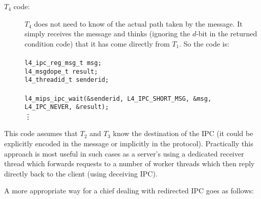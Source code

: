 \begin{description}
\item[$T_4$ code:]
  $T_4$ does not need to know of the actual path taken by the message.
  It simply receives the message and thinks (ignoring the
  \(d\)-bit in the returned condition code) that it has come directly
  from $T_1$. So the code is: \\ \\
  \hspace*{10pt} {\footnotesize\verb+l4_ipc_reg_msg_t msg;+} \\
  \hspace*{10pt} {\footnotesize\verb+l4_msgdope_t result;+} \\
  \hspace*{10pt} {\footnotesize\verb+l4_threadid_t senderid;+} \\ \\
  \hspace*{10pt} {\footnotesize\verb+l4_mips_ipc_wait(&senderid, L4_IPC_SHORT_MSG, &msg, L4_IPC_NEVER, &result);+} \\
  \hspace*{40pt} \vdots   
  
\end{description}

This code assumes that $T_2$ and $T_3$ know the destination of the IPC
(it could be explicitly encoded in the message or implicitly in the
protocol). Practically this approach is most useful in such cases as a
server's using a dedicated receiver thread which forwards requests to a
number of worker threads which then reply directly back to the client
(using deceiving IPC).

A more appropriate way for a chief dealing with redirected IPC goes as
follows:

